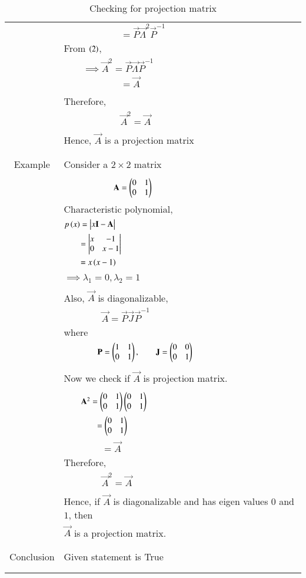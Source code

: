\begin{longtable}{|c|l|}
	&$\qquad\qquad\qquad=\vec{P}\vec{\Lambda}^2\vec{P}^{-1}$\\
	&From $\left(2\right)$,\\
	&$\qquad\implies \vec{A}^2=\vec{P}\vec{\Lambda}\vec{P}^{-1}$\\
	&$\qquad\qquad\qquad=\vec{A}$\\
	&\\
	&Therefore,\\
	&$\qquad\qquad\qquad\vec{A}^2=\vec{A}$\\
	&\\
	& Hence, $\vec{A}$ is a projection matrix\\
	&\\
	\hline
	\multirow{3}{*}{Example} & \\
	& Consider a $2\times 2$ matrix\\
	&\\
	&$\qquad\qquad\qquad \mathbf{A}=\begin{pmatrix}0&1\\0&1\end{pmatrix}$\\
	& Characteristic polynomial,\\
	&$p\left(x\right)=\begin{vmatrix}x\mathbf{I}-\mathbf{A}\end{vmatrix}$\\
	&$\qquad =\begin{vmatrix}x&-1\\0&x-1\end{vmatrix}$\\
	&$\qquad =x\left(x-1\right)$\\
	&\\
	&$\implies\lambda_1=0,\lambda_2=1$\\
	&\\
	&Also, $\vec{A}$ is diagonalizable,\\
	&$\qquad\qquad \vec{A}=\vec{P}\vec{J}\vec{P}^{-1}$\\
	& where\\
	&$\qquad\qquad \mathbf{P}=\begin{pmatrix}1&1\\0&1\end{pmatrix},\qquad\mathbf{J}=\begin{pmatrix}0&0\\0&1\end{pmatrix}$\\
	&\\
	&Now we check if $\vec{A}$ is projection matrix.\\
	&\\
	&$\qquad \mathbf{A}^2=\begin{pmatrix}0&1\\0&1\end{pmatrix}\begin{pmatrix}0&1\\0&1\end{pmatrix}$\\
	&$\qquad\qquad = \begin{pmatrix}0&1\\0&1\end{pmatrix}$\\
	&$\qquad\qquad=\Vec{A}$\\
	&Therefore,\\
	&$\qquad\qquad\Vec{A}^2=\Vec{A}$\\
	&\\
	&Hence, if $\vec{A}$ is diagonalizable and has eigen values $0$ and $1$, then \\
	&$\vec{A}$ is a projection matrix.\\
	&\\
	\hline
	\multirow{3}{*}{Conclusion} & \\
	& Given statement is True\\
	&\\
	\hline
	\caption{Checking for projection matrix}
    \label{eq:solutions/6/6/6/table:2}
\end{longtable}
\twocolumn
